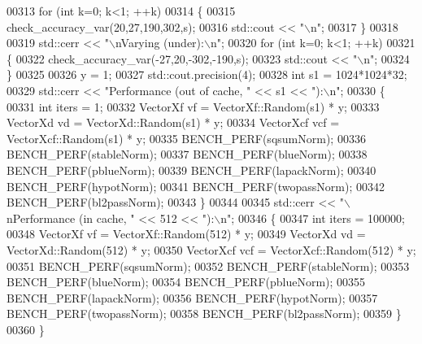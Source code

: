 \begin{DoxyCode}
00313   \textcolor{keywordflow}{for} (\textcolor{keywordtype}{int} k=0; k<1; ++k)
00314   \{
00315     check\_accuracy\_var(20,27,190,302,s);
00316     std::cout << \textcolor{stringliteral}{"\(\backslash\)n"};
00317   \}
00318 
00319   std::cerr << \textcolor{stringliteral}{"\(\backslash\)nVarying (under):\(\backslash\)n"};
00320   \textcolor{keywordflow}{for} (\textcolor{keywordtype}{int} k=0; k<1; ++k)
00321   \{
00322     check\_accuracy\_var(-27,20,-302,-190,s);
00323     std::cout << \textcolor{stringliteral}{"\(\backslash\)n"};
00324   \}
00325 
00326   y = 1;
00327   std::cout.precision(4);
00328   \textcolor{keywordtype}{int} s1 = 1024*1024*32;
00329   std::cerr << \textcolor{stringliteral}{"Performance (out of cache, "} << s1 << \textcolor{stringliteral}{"):\(\backslash\)n"};
00330   \{
00331     \textcolor{keywordtype}{int} iters = 1;
00332     VectorXf vf = VectorXf::Random(s1) * y;
00333     VectorXd vd = VectorXd::Random(s1) * y;
00334     VectorXcf vcf = VectorXcf::Random(s1) * y;
00335     BENCH\_PERF(sqsumNorm);
00336     BENCH\_PERF(stableNorm);
00337     BENCH\_PERF(blueNorm);
00338     BENCH\_PERF(pblueNorm);
00339     BENCH\_PERF(lapackNorm);
00340     BENCH\_PERF(hypotNorm);
00341     BENCH\_PERF(twopassNorm);
00342     BENCH\_PERF(bl2passNorm);
00343   \}
00344 
00345   std::cerr << \textcolor{stringliteral}{"\(\backslash\)nPerformance (in cache, "} << 512 << \textcolor{stringliteral}{"):\(\backslash\)n"};
00346   \{
00347     \textcolor{keywordtype}{int} iters = 100000;
00348     VectorXf vf = VectorXf::Random(512) * y;
00349     VectorXd vd = VectorXd::Random(512) * y;
00350     VectorXcf vcf = VectorXcf::Random(512) * y;
00351     BENCH\_PERF(sqsumNorm);
00352     BENCH\_PERF(stableNorm);
00353     BENCH\_PERF(blueNorm);
00354     BENCH\_PERF(pblueNorm);
00355     BENCH\_PERF(lapackNorm);
00356     BENCH\_PERF(hypotNorm);
00357     BENCH\_PERF(twopassNorm);
00358     BENCH\_PERF(bl2passNorm);
00359   \}
00360 \}
\end{DoxyCode}
